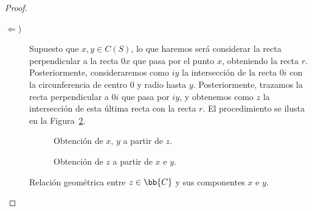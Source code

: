 \begin{lema}
\begin{proof}
\begin{description}
            \item [$\Longleftarrow$)] Supuesto que $x,y\in C(S)$, lo que haremos será considerar la recta perpendicular a la recta $0x$ que pasa por el punto $x$, obteniendo la recta $r$. Posteriormente, consideraremos como $iy$ la intersección de la recta $0i$ con la circunferencia de centro $0$ y radio hasta $y$. Posteriormente, trazamos la recta perpendicular a $0i$ que pasa por $iy$, y obtenemos como $z$ la intersección de esta última recta con la recta $r$. El procedimiento se ilusta en la Figura~\ref{fig:conseguir_z}.
        \end{description}
        \begin{figure}
            \centering
            \begin{subfigure}[b]{0.48\textwidth}
                \centering
                \caption{Obtención de $x$, $y$ a partir de $z$.}
                \label{fig:conseguir_xy}
            \end{subfigure}
            \hfill
            \begin{subfigure}[b]{0.48\textwidth}
                \centering
                \caption{Obtención de $z$ a partir de $x$ e $y$.}
                \label{fig:conseguir_z}
            \end{subfigure}
            \caption{Relación geométrica entre $z\in \bb{C}$ y sus componentes $x$ e $y$.}
            \label{fig:relacion_z_xy}
        \end{figure}
    \end{proof}
\end{lema}


